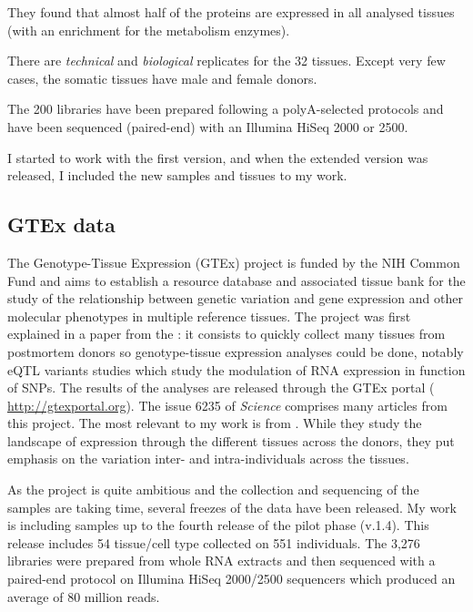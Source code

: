 They found that almost half of the proteins are expressed in all analysed tissues
(with an enrichment for the metabolism enzymes).

There are \emph{technical} and \emph{biological} replicates for the 32 tissues.
Except very few cases, the somatic tissues have male and female donors.

The 200 libraries have been prepared following a polyA-selected protocols and
have been sequenced (paired-end) with an Illumina HiSeq 2000 or 2500.

I started to work with the first version, and when the extended version was
released, I included the new samples and tissues to my work.

\subsection{GTEx data}

The Genotype-Tissue Expression (\gls{GTEx}) project is funded by the NIH Common
Fund and aims to establish a resource database and associated tissue bank
for the study of the relationship between genetic variation and gene expression
and other molecular phenotypes in multiple reference tissues. The project was first
explained in a paper from the \cite{GTEx2013}: it consists to quickly collect
many tissues from postmortem donors so genotype-tissue expression analyses could
be done, notably \gls{eQTL} variants studies which study the modulation
of \gls{RNA} expression in function of \glspl{SNP}. The results of the
analyses are released through the GTEx portal (%
\href{http://gtexportal.org}{http://gtexportal.org}). The issue 6235 of
\emph{Science} comprises
many articles from this project. The most relevant to my work is
 from \cite{GTExTranscript}. While they study
the landscape of expression through the different tissues across the donors, they
put emphasis on the variation inter- and intra-individuals across the tissues.

As the project is quite ambitious and the collection and sequencing of the samples
are taking time, several freezes of the data have been released. My work is
including samples up to the fourth release of the pilot phase (v.1.4). This
release includes 54 tissue/cell type collected on 551 individuals.
The 3,276 libraries were prepared from whole \gls{RNA} extracts and then sequenced
with a paired-end protocol on Illumina HiSeq 2000/2500 sequencers which produced
an average of 80 million reads.

